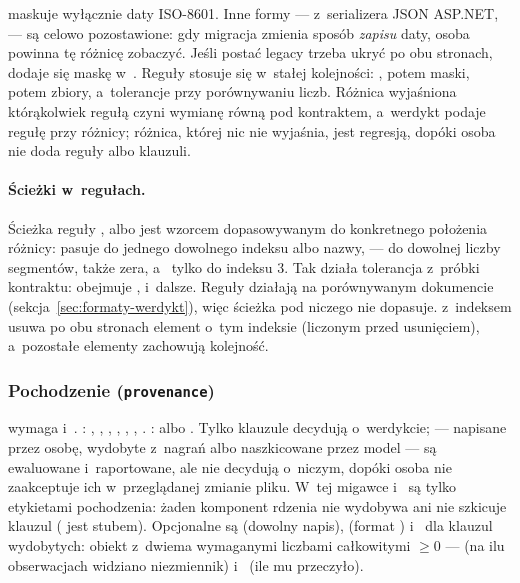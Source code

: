  maskuje wyłącznie daty ISO-8601. Inne formy --- 
z~serializera JSON ASP.NET,  --- są celowo pozostawione: gdy migracja
zmienia sposób \emph{zapisu} daty, osoba powinna tę różnicę zobaczyć. Jeśli postać legacy
trzeba ukryć po obu stronach, dodaje się maskę w~. Reguły stosuje się w~stałej kolejności: , potem maski, potem zbiory, a~tolerancje przy
porównywaniu liczb. Różnica wyjaśniona którąkolwiek regułą czyni wymianę równą pod kontraktem,
a~werdykt podaje regułę przy różnicy; różnica, której nic nie wyjaśnia, jest regresją, dopóki
osoba nie doda reguły albo klauzuli.

\paragraph{Ścieżki w~regułach.} Ścieżka reguły ,  albo
 jest wzorcem dopasowywanym do konkretnego położenia różnicy: \repopath{[*]}
pasuje do jednego dowolnego indeksu albo nazwy, \repopath{**} --- do dowolnej liczby segmentów,
także zera, a~\repopath{[3]} tylko do indeksu 3. Tak działa tolerancja
 z~próbki kontraktu: obejmuje
,  i~dalsze. Reguły działają na porównywanym
dokumencie (sekcja~\ref{sec:formaty-werdykt}), więc ścieżka pod  niczego nie
dopasuje.  z~indeksem usuwa po obu stronach element o~tym indeksie (liczonym
przed usunięciem), a~pozostałe elementy zachowują kolejność.

\subsubsection{Pochodzenie (\texttt{provenance})}

 wymaga  i~. :
, , , ,
, , . :
 albo . Tylko klauzule  decydują o~werdykcie;  --- napisane przez osobę, wydobyte z~nagrań albo naszkicowane
przez model --- są ewaluowane i~raportowane, ale nie decydują o~niczym, dopóki osoba nie
zaakceptuje ich w~przeglądanej zmianie pliku. W~tej migawce  i~
są tylko etykietami pochodzenia: żaden komponent rdzenia nie wydobywa ani nie szkicuje klauzul
( jest stubem). Opcjonalne są  (dowolny
napis),  (format ) i~ dla klauzul wydobytych:
obiekt z~dwiema wymaganymi liczbami całkowitymi $\geq 0$ ---  (na ilu
obserwacjach widziano niezmiennik) i~ (ile mu przeczyło).

